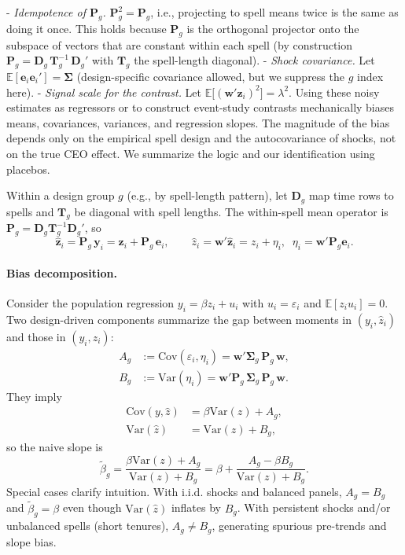 \documentclass[11pt,a4paper]{article}
\newcommand{\Var}{\text{Var}}
\newcommand{\Cov}{\text{Cov}}
\begin{document}
- \textit{Idempotence of $\mathbf P_g$.} $\mathbf P_g^2=\mathbf P_g$, i.e., projecting to spell means twice is the same as doing it once. This holds because $\mathbf P_g$ is the orthogonal projector onto the subspace of vectors that are constant within each spell (by construction $\mathbf P_g=\mathbf D_g\,\mathbf T_g^{-1}\,\mathbf D_g'$ with $\mathbf T_g$ the spell-length diagonal).
- \textit{Shock covariance.} Let $\mathbb E[\mathbf e_i\mathbf e_i']=\boldsymbol\Sigma$ (design-specific covariance allowed, but we suppress the $g$ index here).
- \textit{Signal scale for the contrast.} Let $\mathbb E\big[(\mathbf w'\mathbf z_i)^2\big]=\lambda^2$.
 Using these noisy estimates as regressors or to construct event-study contrasts mechanically biases means, covariances, variances, and regression slopes. The magnitude of the bias depends only on the empirical spell design and the autocovariance of shocks, not on the true CEO effect. We summarize the logic and our identification using placebos.

 Within a design group $g$ (e.g., by spell-length pattern), let $\mathbf D_g$ map time rows to spells and $\mathbf T_g$ be diagonal with spell lengths. The within-spell mean operator is $\mathbf P_g=\mathbf D_g\mathbf T_g^{-1}\mathbf D_g'$, so
\begin{equation}
\hat{\mathbf z}_i = \mathbf P_g\,\mathbf y_i = \mathbf z_i + \mathbf P_g\,\mathbf e_i,\qquad \hat z_i = \mathbf w'\hat{\mathbf z}_i = z_i + \eta_i,\;\; \eta_i=\mathbf w'\mathbf P_g\mathbf e_i.
\end{equation}




\paragraph{Bias decomposition.} Consider the population regression $y_i=\beta z_i+u_i$ with $u_i=\varepsilon_i$ and $\mathbb E[z_i u_i]=0$. Two design-driven components summarize the gap between moments in $(y_i,\hat z_i)$ and those in $(y_i,z_i)$:
\begin{align}
A_g &:= \Cov(\varepsilon_i,\eta_i) = \mathbf w'\boldsymbol\Sigma_g\,\mathbf P_g\,\mathbf w,\\
B_g &:= \Var(\eta_i) = \mathbf w'\mathbf P_g\,\boldsymbol\Sigma_g\,\mathbf P_g\,\mathbf w.
\end{align}
They imply
\begin{align}
\Cov(y,\hat z) &= \beta\Var(z) + A_g,\\
\Var(\hat z) &= \Var(z) + B_g,
\end{align}
so the naive slope is
\begin{equation}
\tilde\beta_g = \frac{\beta\Var(z)+A_g}{\Var(z)+B_g} = \beta + \frac{A_g-\beta B_g}{\Var(z)+B_g}.
\end{equation}
Special cases clarify intuition. With i.i.d. shocks and balanced panels, $A_g=B_g$ and $\tilde\beta_g=\beta$ even though $\Var(\hat z)$ inflates by $B_g$. With persistent shocks and/or unbalanced spells (short tenures), $A_g\neq B_g$, generating spurious pre-trends and slope bias.
\end{document}
